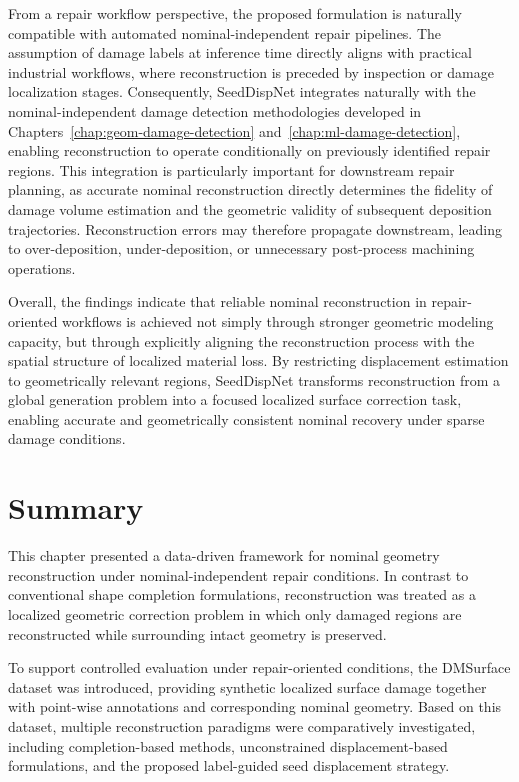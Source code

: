 From a repair workflow perspective, the proposed formulation is naturally compatible with automated nominal-independent repair pipelines. The assumption of damage labels at inference time directly aligns with practical industrial workflows, where reconstruction is preceded by inspection or damage localization stages. Consequently, SeedDispNet integrates naturally with the nominal-independent damage detection methodologies developed in Chapters~\ref{chap:geom-damage-detection} and~\ref{chap:ml-damage-detection}, enabling reconstruction to operate conditionally on previously identified repair regions. This integration is particularly important for downstream repair planning, as accurate nominal reconstruction directly determines the fidelity of damage volume estimation and the geometric validity of subsequent deposition trajectories. Reconstruction errors may therefore propagate downstream, leading to over-deposition, under-deposition, or unnecessary post-process machining operations.

Overall, the findings indicate that reliable nominal reconstruction in repair-oriented workflows is achieved not simply through stronger geometric modeling capacity, but through explicitly aligning the reconstruction process with the spatial structure of localized material loss. By restricting displacement estimation to geometrically relevant regions, SeedDispNet transforms reconstruction from a global generation problem into a focused localized surface correction task, enabling accurate and geometrically consistent nominal recovery under sparse damage conditions.

\section{Summary}
\label{sec:summary}

This chapter presented a data-driven framework for nominal geometry reconstruction under nominal-independent repair conditions. In contrast to conventional shape completion formulations, reconstruction was treated as a localized geometric correction problem in which only damaged regions are reconstructed while surrounding intact geometry is preserved.

To support controlled evaluation under repair-oriented conditions, the DMSurface dataset was introduced, providing synthetic localized surface damage together with point-wise annotations and corresponding nominal geometry. Based on this dataset, multiple reconstruction paradigms were comparatively investigated, including completion-based methods, unconstrained displacement-based formulations, and the proposed label-guided seed displacement strategy.

